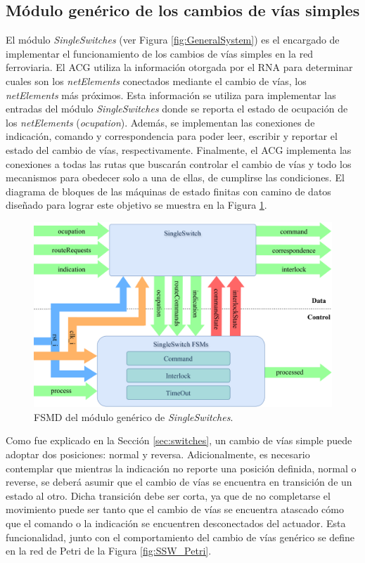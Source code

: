 \subsection{Módulo genérico de los cambios de vías simples}
	\label{sec:ACG_ssw}
	
	El módulo \textit{SingleSwitches} (ver Figura \ref{fig:GeneralSystem}) es el encargado de implementar el funcionamiento de los cambios de vías simples en la red ferroviaria. El ACG utiliza la información otorgada por el RNA para determinar cuales son los \textit{netElements} conectados mediante el cambio de vías, los \textit{netElements} más próximos. Esta información se utiliza para implementar las entradas del módulo \textit{SingleSwitches} donde se reporta el estado de ocupación de los \textit{netElements} (\textit{ocupation}). Además, se implementan las conexiones de indicación, comando y correspondencia para poder leer, escribir y reportar el estado del cambio de vías, respectivamente. Finalmente, el ACG implementa las conexiones a todas las rutas que buscarán controlar el cambio de vías y todo los mecanismos para obedecer solo a una de ellas, de cumplirse las condiciones. El diagrama de bloques de las máquinas de estado finitas con camino de datos diseñado para lograr este objetivo se muestra en la Figura \ref{fig:SSW_module}.
	
	\begin{figure}[H]
		\centering
		\includegraphics[width=1\textwidth]{Figuras/SSW_module}
		\centering\caption{FSMD del módulo genérico de \textit{SingleSwitches}.}
		\label{fig:SSW_module}
	\end{figure}
	
	Como fue explicado en la Sección \ref{sec:switches}, un cambio de vías simple puede adoptar dos posiciones: normal y reversa. Adicionalmente, es necesario contemplar que mientras la indicación no reporte una posición definida, normal o reverse, se deberá asumir que el cambio de vías se encuentra en transición de un estado al otro. Dicha transición debe ser corta, ya que de no completarse el movimiento puede ser tanto que el cambio de vías se encuentra atascado cómo que el comando o la indicación se encuentren desconectados del actuador. Esta funcionalidad, junto con el comportamiento del cambio de vías genérico se define en la red de Petri de la Figura \ref{fig:SSW_Petri}.
	
